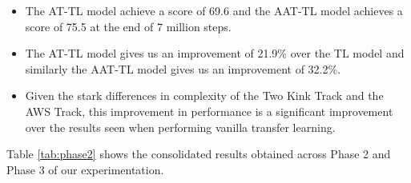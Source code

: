 \begin{itemize}
    \item The AT-TL model achieve a score of 69.6 and the AAT-TL model achieves a score of 75.5 at the end of 7 million steps.
    \item The AT-TL model gives us an improvement of 21.9\% over the TL model and similarly the AAT-TL model gives us an improvement of 32.2\%.
    \item Given the stark differences in complexity of the Two Kink Track and the AWS Track, this improvement in performance is a significant improvement over the results seen when performing vanilla transfer learning.
\end{itemize}

 

Table \ref{tab:phase2} shows the consolidated results obtained across Phase 2 and Phase 3 of our experimentation.


